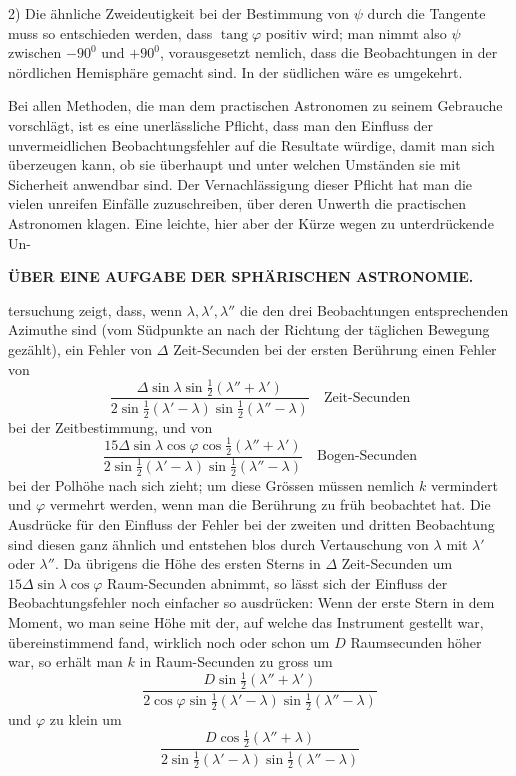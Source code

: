 2) Die ähnliche Zweideutigkeit bei der Bestimmung von $\psi$ durch die Tangente
muss so entschieden werden, dass $\operatorname{tang}\varphi$ positiv wird; man nimmt also
$\psi$ zwischen $-90^0$ und $+90^0$, vorausgesetzt nemlich, dass die Beobachtungen
in der nördlichen Hemisphäre gemacht sind. In der südlichen wäre es umgekehrt.

Bei allen Methoden, die man dem practischen Astronomen zu seinem Gebrauche
vorschlägt, ist es eine unerlässliche Pflicht, dass man den Einfluss der
unvermeidlichen Beobachtungsfehler auf die Resultate würdige, damit man sich
überzeugen kann, ob sie überhaupt und unter welchen Umständen sie mit Sicherheit
anwendbar sind. Der Vernachlässigung dieser Pflicht hat man die vielen
unreifen Einfälle zuzuschreiben, über deren Unwerth die practischen Astronomen
klagen. Eine leichte, hier aber der Kürze wegen zu unterdrückende Un-\par
\clearpage
\thispagestyle{empty}
\noindent{}%
\makebox[12mm][l]{}%
\parbox[t]{\dimexpr\linewidth-24mm\relax}{\centering\footnotesize\bfseries ÜBER EINE AUFGABE DER SPHÄRISCHEN ASTRONOMIE.\par}%
\par\nobreak\medskip
\noindent tersuchung zeigt, dass, wenn $\lambda,\lambda',\lambda''$ die den drei Beobachtungen entsprechenden
Azimuthe sind (vom Südpunkte an nach der Richtung der täglichen Bewegung
gezählt), ein Fehler von $\Delta$ Zeit-Secunden bei der ersten Berührung einen
Fehler von
\[
\frac{\Delta\sin\lambda\sin\tfrac12(\lambda''+\lambda')}{2\sin\tfrac12(\lambda'-\lambda)\sin\tfrac12(\lambda''-\lambda)}\quad\text{Zeit-Secunden}
\]
bei der Zeitbestimmung, und von
\[
\frac{15\Delta\sin\lambda\cos\varphi\cos\tfrac12(\lambda''+\lambda')}{2\sin\tfrac12(\lambda'-\lambda)\sin\tfrac12(\lambda''-\lambda)}\quad\text{Bogen-Secunden}
\]
bei der Polhöhe nach sich zieht; um diese Grössen müssen nemlich $k$ vermindert
und $\varphi$ vermehrt werden, wenn man die Berührung zu früh beobachtet hat.
Die Ausdrücke für den Einfluss der Fehler bei der zweiten und dritten Beobachtung
sind diesen ganz ähnlich und entstehen blos durch Vertauschung von $\lambda$ mit
$\lambda'$ oder $\lambda''$. Da übrigens die Höhe des ersten Sterns in $\Delta$ Zeit-Secunden um
$15\Delta\sin\lambda\cos\varphi$ Raum-Secunden abnimmt, so lässt sich der Einfluss der Beobachtungsfehler
noch einfacher so ausdrücken: Wenn der erste Stern in dem Moment,
wo man seine Höhe mit der, auf welche das Instrument gestellt war, übereinstimmend
fand, wirklich noch oder schon um $D$ Raumsecunden höher war, so
erhält man $k$ in Raum-Secunden zu gross um
\[
\frac{D\sin\tfrac12(\lambda''+\lambda')}{2\cos\varphi\sin\tfrac12(\lambda'-\lambda)\sin\tfrac12(\lambda''-\lambda)}
\]
und $\varphi$ zu klein um
\[
\frac{D\cos\tfrac12(\lambda''+\lambda)}{2\sin\tfrac12(\lambda'-\lambda)\sin\tfrac12(\lambda''-\lambda)}
\]

